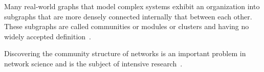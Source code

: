 Many real-world graphs that model complex systems 
exhibit an organization into subgraphs that are more 
densely connected internally that between each other. 
These subgraphs are called communities or modules or clusters 
and having no widely accepted definition~\cite{LF09, PDFV05}. 

Discovering the community structure of networks is an 
important problem in network science and is the subject 
of intensive research~\cite{GN02, GN04, BGLL08, RCC04, PDFV05, RB08, 
DM04, NL07, RN09}.

